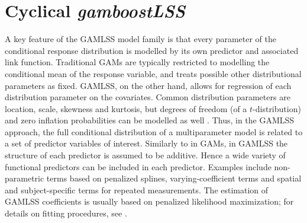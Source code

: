 \section{Cyclical \textit{gamboostLSS}}\label{sec:gamlssboost}
A key feature of the GAMLSS model family is that every parameter of the conditional response distribution is modelled by its own predictor and associated link function.
Traditional GAMs \citep{gam-book} are typically restricted to modelling the conditional mean of the response variable, and treats possible other distributional parameters as fixed.
GAMLSS, on the other hand, allows for regression of each distribution parameter on the covariates.
Common distribution parameters are location, scale, skewness and kurtosis, but degrees of freedom (of a $t$-distribution) and zero inflation probabilities can be modelled as well \citep{gamboostlss-paper}.
Thus, in the GAMLSS approach, the full conditional distribution of a multiparameter model is related to a set of predictor variables of interest.
Similarly to in GAMs, in GAMLSS the structure of each predictor is assumed to be additive.
Hence a wide variety of functional predictors can be included in each predictor.
Examples include non-parametric terms based on penalized splines, varying-coefficient terms and spatial and subject-specific terms for repeated measurements.
The estimation of GAMLSS coefficients is usually based on penalized likelihood maximization; for details on fitting procedures, see \citet{gamlss}.

